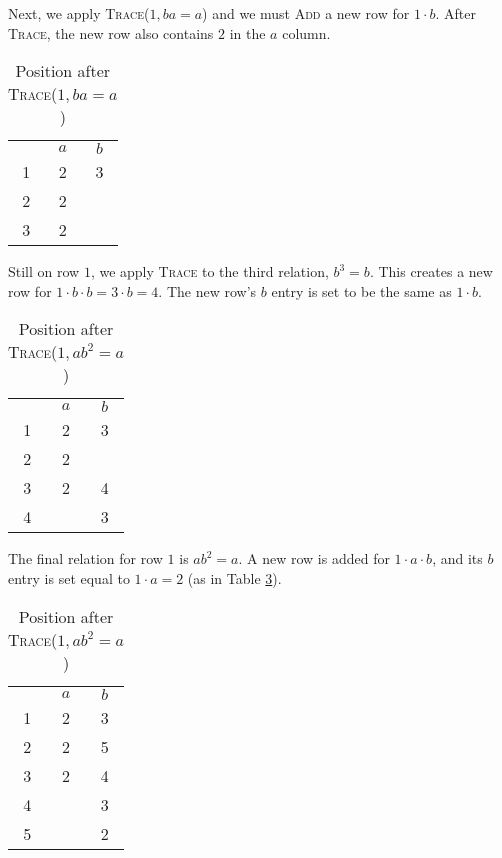Next, we apply \textsc{Trace}($1, ba=a$) and we must \textsc{Add} a new row for
$1 \cdot b$.  After \textsc{Trace}, the new row also contains $2$ in the $a$
column.
\begin{table}[H]
  \centering
  \begin{tabular}{c | c | c |}
    \multicolumn{1}{c}{} &
    \multicolumn{1}{c}{$a$} &
    \multicolumn{1}{c}{$b$} \\
    \cline{2-3}
    1 & 2 & 3 \\
    \cline{2-3}
    2 & 2 & \\
    \cline{2-3}
    3 & 2 & \\
    \cline{2-3}
  \end{tabular}
  \caption{Position after \textsc{Trace}($1, ba=a$)}
  \label{tab:tc3}
\end{table}

Still on row $1$, we apply \textsc{Trace} to the third relation, $b^3=b$.  This
creates a new row for $1 \cdot b \cdot b = 3 \cdot b = 4$.  The new row's $b$
entry is set to be the same as $1 \cdot b$.
\begin{table}[H]
  \centering
  \begin{tabular}{c | c | c |}
    \multicolumn{1}{c}{} &
    \multicolumn{1}{c}{$a$} &
    \multicolumn{1}{c}{$b$} \\
    \cline{2-3}
    1 & 2 & 3 \\
    \cline{2-3}
    2 & 2 & \\
    \cline{2-3}
    3 & 2 & 4 \\
    \cline{2-3}
    4 &  & 3 \\
    \cline{2-3}
  \end{tabular}
  \caption{Position after \textsc{Trace}($1, ab^2=a$)}
  \label{tab:tc4}
\end{table}

The final relation for row $1$ is $ab^2=a$.  A new row is added for $1 \cdot a
\cdot b$, and its $b$ entry is set equal to $1 \cdot a = 2$ (as in Table
\ref{tab:tc5}).
\begin{table}[H]
  \centering
  \begin{tabular}{c | c | c |}
    \multicolumn{1}{c}{} &
    \multicolumn{1}{c}{$a$} &
    \multicolumn{1}{c}{$b$} \\
    \cline{2-3}
    1 & 2 & 3 \\
    \cline{2-3}
    2 & 2 & 5 \\
    \cline{2-3}
    3 & 2 & 4 \\
    \cline{2-3}
    4 &  & 3 \\
    \cline{2-3}
    5 & & 2 \\
    \cline{2-3}
  \end{tabular}
  \caption{Position after \textsc{Trace}($1, ab^2=a$)}
  \label{tab:tc5}
\end{table}

